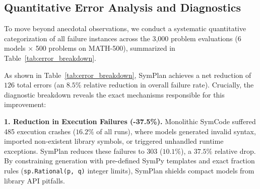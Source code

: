 \documentclass[conference,a4paper]{IEEEtran}
\begin{document}
\subsection{Quantitative Error Analysis and Diagnostics}
\label{sec:error_analysis}

To move beyond anecdotal observations, we conduct a systematic quantitative categorization of all failure instances across the 3,000 problem evaluations (6 models $\times$ 500 problems on MATH-500), summarized in Table~\ref{tab:error_breakdown}.

\begin{table}[t]
\centering
\caption{Quantitative failure mode comparison between SymCode and SymPlan across all 3,000 problem evaluations on MATH-500.}
\label{tab:error_breakdown}
\end{table}

As shown in Table~\ref{tab:error_breakdown}, SymPlan achieves a net reduction of $126$ total errors (an $8.5\%$ relative reduction in overall failure rate). Crucially, the diagnostic breakdown reveals the exact mechanisms responsible for this improvement:

\textbf{1. Reduction in Execution Failures (-37.5\%).} Monolithic SymCode suffered 485 execution crashes ($16.2\%$ of all runs), where models generated invalid syntax, imported non-existent library symbols, or triggered unhandled runtime exceptions. SymPlan reduces these failures to 303 ($10.1\%$), a $37.5\%$ relative drop. By constraining generation with pre-defined SymPy templates and exact fraction rules (\texttt{sp.Rational(p, q)} integer limits), SymPlan shields compact models from library API pitfalls.
\end{document}
